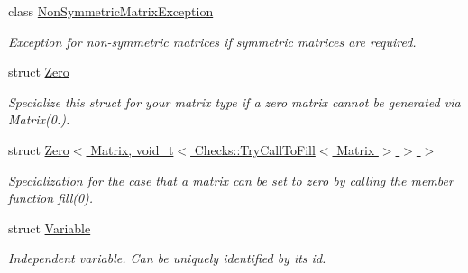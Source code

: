 \begin{DoxyCompactItemize}
class \hyperlink{classFunG_1_1NonSymmetricMatrixException}{Non\-Symmetric\-Matrix\-Exception}
\begin{DoxyCompactList}\small\item\em Exception for non-\/symmetric matrices if symmetric matrices are required. \end{DoxyCompactList}\item 
struct \hyperlink{structFunG_1_1Zero}{Zero}
\begin{DoxyCompactList}\small\item\em Specialize this struct for your matrix type if a zero matrix cannot be generated via Matrix(0.). \end{DoxyCompactList}\item 
struct \hyperlink{structFunG_1_1Zero_3_01Matrix_00_01void__t_3_01Checks_1_1TryCallToFill_3_01Matrix_01_4_01_4_01_4}{Zero$<$ Matrix, void\-\_\-t$<$ Checks\-::\-Try\-Call\-To\-Fill$<$ Matrix $>$ $>$ $>$}
\begin{DoxyCompactList}\small\item\em Specialization for the case that a matrix can be set to zero by calling the member function fill(0). \end{DoxyCompactList}\item 
struct \hyperlink{structFunG_1_1Variable}{Variable}
\begin{DoxyCompactList}\small\item\em Independent variable. Can be uniquely identified by its id. \end{DoxyCompactList}\end{DoxyCompactItemize}
